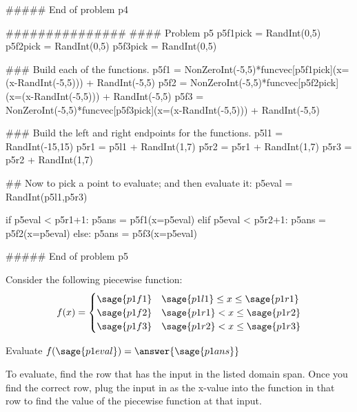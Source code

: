\documentclass{ximera}
\begin{document}
\begin{sagesilent}
##### End of problem p4




###############
#### Problem p5
p5f1pick = RandInt(0,5)
p5f2pick = RandInt(0,5)
p5f3pick = RandInt(0,5)

### Build each of the functions.
p5f1 = NonZeroInt(-5,5)*funcvec[p5f1pick](x=(x-RandInt(-5,5))) + RandInt(-5,5)
p5f2 = NonZeroInt(-5,5)*funcvec[p5f2pick](x=(x-RandInt(-5,5))) + RandInt(-5,5)
p5f3 = NonZeroInt(-5,5)*funcvec[p5f3pick](x=(x-RandInt(-5,5))) + RandInt(-5,5)

### Build the left and right endpoints for the functions.
p5l1 = RandInt(-15,15)
p5r1 = p5l1 + RandInt(1,7)
p5r2 = p5r1 + RandInt(1,7)
p5r3 = p5r2 + RandInt(1,7)

## Now to pick a point to evaluate; and then evaluate it:
p5eval = RandInt(p5l1,p5r3)

if p5eval < p5r1+1:
    p5ans = p5f1(x=p5eval)
elif p5eval < p5r2+1:
    p5ans = p5f2(x=p5eval)
else:
    p5ans = p5f3(x=p5eval)


##### End of problem p5




\end{sagesilent}

\begin{problem}
    Consider the following piecewise function:
    \[
        f(x) =
            \begin{cases}
                \sage{p1f1}     & \sage{p1l1}\leq x \leq \sage{p1r1} \\
                \sage{p1f2}     & \sage{p1r1} < x \leq \sage{p1r2} \\
                \sage{p1f3}     & \sage{p1r2} < x \leq \sage{p1r3}
            \end{cases}
    \]
    
    Evaluate $f(\sage{p1eval}) = \answer{\sage{p1ans}}$
    \begin{feedback}
        To evaluate, find the row that has the input in the listed domain span. Once you find the correct row, plug the input in as the x-value into the function in that row to find the value of the piecewise function at that input.
    \end{feedback}
    
\end{problem}
\end{document}
